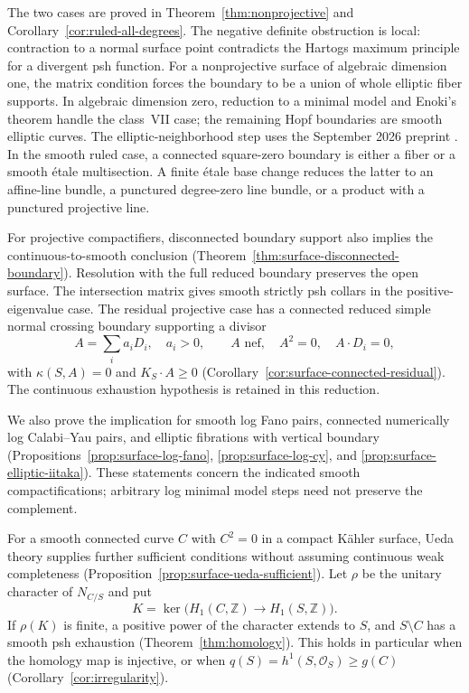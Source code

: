 \documentclass[11pt]{amsart}
\theoremstyle{definition}
\theoremstyle{remark}
\numberwithin{equation}{section}
\newcommand{\OO}{\mathcal O}
\begin{document}
The two cases are proved in Theorem~\ref{thm:nonprojective} and
Corollary~\ref{cor:ruled-all-degrees}. The negative definite obstruction
is local: contraction to a normal surface point contradicts the
Hartogs maximum principle for a divergent psh function. For a
nonprojective surface of algebraic dimension one, the matrix condition
forces the boundary to be a union of whole elliptic fiber supports.
In algebraic dimension zero, reduction to a minimal model and Enoki's
theorem handle the class~VII case; the remaining Hopf boundaries are
smooth elliptic curves. The elliptic-neighborhood step uses the
September 2026 preprint \cite{CFSTZ2026}. In the smooth ruled case,
a connected square-zero boundary is either a fiber or a smooth
\'etale multisection. A finite \'etale base change reduces the latter
to an affine-line bundle, a punctured degree-zero line bundle, or a
product with a punctured projective line.

For projective compactifiers, disconnected boundary support also
implies the continuous-to-smooth conclusion
(Theorem~\ref{thm:surface-disconnected-boundary}). Resolution with the
full reduced boundary preserves the open surface. The intersection
matrix gives smooth strictly psh collars in the positive-eigenvalue
case. The residual projective case has a connected reduced simple
normal crossing boundary supporting a divisor
\[
 A=\sum_i a_iD_i,\quad a_i>0,\qquad
 A\text{ nef},\quad A^2=0,\quad A\cdot D_i=0,
\]
with $\kappa(S,A)=0$ and $K_S\cdot A\ge0$
(Corollary~\ref{cor:surface-connected-residual}). The continuous
exhaustion hypothesis is retained in this reduction.

We also prove the implication for smooth log Fano pairs, connected
numerically log Calabi--Yau pairs, and elliptic fibrations with vertical
boundary (Propositions~\ref{prop:surface-log-fano},
\ref{prop:surface-log-cy}, and \ref{prop:surface-elliptic-iitaka}).
These statements concern the indicated smooth compactifications;
arbitrary log minimal model steps need not preserve the complement.

For a smooth connected curve $C$ with $C^2=0$ in a compact K\"ahler
surface, Ueda theory supplies further sufficient conditions without
assuming continuous weak completeness
(Proposition~\ref{prop:surface-ueda-sufficient}). Let $\rho$ be the
unitary character of $N_{C/S}$ and put
\[
 K=\ker\bigl(H_1(C,\mathbb Z)\longrightarrow H_1(S,\mathbb Z)\bigr).
\]
If $\rho(K)$ is finite, a positive power of the character extends
to $S$, and $S\setminus C$ has a smooth psh exhaustion
(Theorem~\ref{thm:homology}). This holds in particular when the
homology map is injective, or when
$q(S)=h^1(S,\OO_S)\ge g(C)$
(Corollary~\ref{cor:irregularity}).
\end{document}
